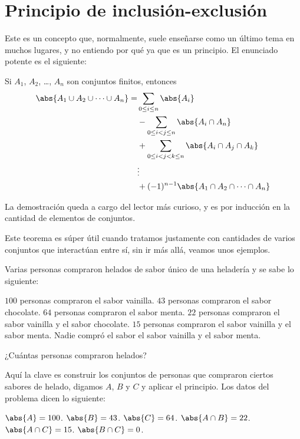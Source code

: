 \section{Principio de inclusión-exclusión}
Este es un concepto que, normalmente, suele
enseñarse como un último tema en muchos lugares,
y no entiendo por qué ya que es un principio.
El enunciado potente es el siguiente:
\begin{proposition}
	Si $A_1$, $A_2$, \dots, $A_n$ son conjuntos finitos, entonces
	\begin{align*}
		\abs{A_1 \cup A_2 \cup \cdots \cup A_n} = & \sum_{0 \leq i \leq n}\abs{A_i}                             \\
		                                          & - \sum_{0 \leq i < j \leq n}\abs{A_i\cap A_n}               \\
		                                          & + \sum_{0 \leq i < j < k \leq n}\abs{A_i \cap A_j \cap A_k} \\
		                                          & \vdots                                                      \\
		                                          & + (-1)^{n - 1} \abs{A_1 \cap A_2 \cap \cdots \cap A_n}
	\end{align*}
\end{proposition}
La demostración queda a cargo del lector
más curioso, %
y es por inducción en la cantidad de
elementos de conjuntos.

Este teorema es súper útil cuando tratamos
justamente con cantidades de varios
conjuntos que interactúan entre sí,
sin ir más allá, veamos unos ejemplos.

\begin{example}
	Varias personas compraron helados
	de sabor único
	de una heladería y se sabe lo siguiente:
	\begin{itemize}
		\ii $100$ personas compraron el sabor vainilla.
		\ii $43$ personas compraron el sabor chocolate.
		\ii $64$ personas compraron el sabor menta.
		\ii $22$ personas compraron el sabor vainilla y el sabor chocolate.
		\ii $15$ personas compraron el sabor vainilla y el sabor menta.
		\ii Nadie compró el sabor el sabor vainilla y el sabor menta.
	\end{itemize}
	¿Cuántas personas compraron helados?
\end{example}

Aquí la clave es construir los conjuntos
de personas que compraron ciertos sabores de helado,
digamos $A$, $B$ y $C$ y aplicar el principio.
Los datos del problema dicen lo siguiente:
\begin{itemize}
	\ii $\abs{A} = 100$.
	\ii $\abs{B} = 43$.
	\ii $\abs{C} = 64$.
	\ii $\abs{A \cap B} = 22$.
	\ii $\abs{A \cap C} = 15$.
	\ii $\abs{B \cap C} = 0$.
\end{itemize}

